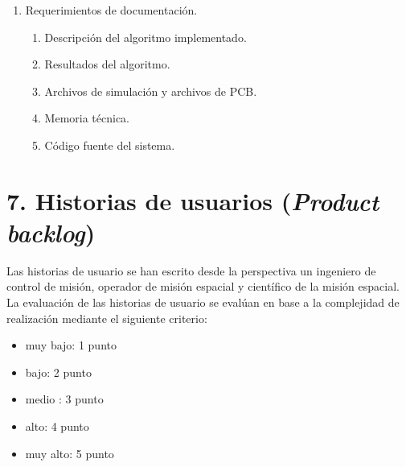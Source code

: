 \documentclass[
11pt, %
]{charter}
\begin{document}
\begin{enumerate}
\item Requerimientos de documentación.
	\begin{enumerate}
		\item Descripción del algoritmo implementado. 
		\item Resultados del algoritmo. 
		\item Archivos de simulación y archivos de PCB. 
		\item Memoria técnica.
		\item Código fuente del sistema. 
	\end{enumerate}
\end{enumerate}



\section{7. Historias de usuarios (\textit{Product backlog})}
\label{sec:backlog}
Las historias de usuario se han escrito desde la perspectiva un ingeniero de control de misión, operador de misión espacial y científico de la misión espacial. La evaluación de las historias de usuario se evalúan en base a la complejidad de realización mediante el siguiente criterio: 
\begin{itemize}
	\item muy bajo: 1 punto 
	\item bajo: 2 punto 
	\item medio : 3 punto 
	\item alto: 4 punto 
	\item muy alto: 5 punto 
	

\end{itemize}
\end{document}
